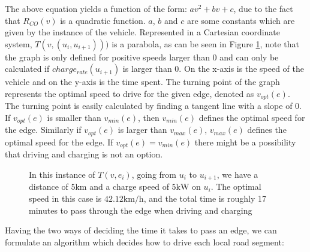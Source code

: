 The above equation yields a function of the form: $av^2 + bv + c$, due to the fact that $R_{CO}(v)$ is a quadratic function. $a$, $b$ and $c$ are some constants which are given by the instance of the vehicle. Represented in a Cartesian coordinate system, $T(v,(u_i, u_{i+1})))$ is a parabola, as can be seen in Figure \ref{fig:graph}, note that the graph is only defined for positive speeds larger than $0$ and can only be calculated if $charge_{rate}(u_{i+1})$ is larger than $0$. On the x-axis is the speed of the vehicle and on the y-axis is the time spent. The turning point of the graph represents the optimal speed to drive for the given edge, denoted as $v_{opt}(e)$. The turning point is easily calculated by finding a tangent line with a slope of $0$. If $v_{opt}(e)$ is smaller than $v_{min}(e)$, then $v_{min}(e)$ defines the optimal speed for the edge. Similarly if $v_{opt}(e)$ is larger than $v_{max}(e)$, $v_{max}(e)$ defines the optimal speed for the edge. If $v_{opt}(e) = v_{min}(e)$ there might be a possibility that driving and charging is not an option. 

\begin{figure}[!htb]
\label{fig:graph}
% 
\caption{In this instance of $T(v,e_i)$, going from $u_i$ to $u_{i+1}$, we have a distance of $5 \si{\km}$ and a charge speed of $5 \si{\kW}$ on $u_i$. The optimal speed in this case is $42.12\si{\km\per\hour}$, and the total time is roughly 17 minutes to pass through the edge when driving and charging}
\label{fig:graph}
\end{figure}
Having the two ways of deciding the time it takes to pass an edge, we can formulate an algorithm which decides how to drive each local road segment:

